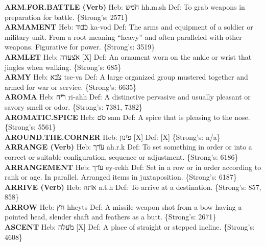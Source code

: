 {\textbf{ARM.FOR.BATTLE (Verb)} Heb: {\large\H חמש} hh.m.sh Def: To grab weapons in preparation for battle. \{Strong's: 2571\}\hfill{}\\

\textbf{ARMAMENT} Heb: {\large\H כבוד} ka-vod Def: The arms and equipment of a soldier or military unit. From a root meaning ``heavy'' and often paralleled with other weapons. Figurative for power. \{Strong's: 3519\}\hfill{}\\

\textbf{ARMLET} Heb: {\large\H אצעדה} {[}X{]} Def: An ornament worn on the ankle or wrist that jingles when walking. \{Strong's: 685\}\hfill{}\\

\textbf{ARMY} Heb: {\large\H צבא} tse-va Def: A large organized group mustered together and armed for war or service. \{Strong's: 6635\}\hfill{}\\

\textbf{AROMA} Heb: {\large\H ריח} ri-ahh Def: A distinctive pervasive and usually pleasant or savory smell or odor. \{Strong's: 7381, 7382\}\hfill{}\\

\textbf{AROMATIC.SPICE} Heb: {\large\H סם} sam Def: A spice that is pleasing to the nose. \{Strong's: 5561\}\hfill{}\\

\textbf{AROUND.THE.CORNER} Heb: {\large\H פינון} {[}X{]} Def: {[}X{]} \{Strong's: n/a\}\hfill{}\\

\textbf{ARRANGE (Verb)} Heb: {\large\H ערך} ah.r.k Def: To set something in order or into a correct or suitable configuration, sequence or adjustment. \{Strong's: 6186\}\hfill{}\\

\textbf{ARRANGEMENT} Heb: {\large\H ערך} ey-rekh Def: Set in a row or in order according to rank or age. In parallel. Arranged items in juxtaposition. \{Strong's: 6187\}\hfill{}\\

\textbf{ARRIVE (Verb)} Heb: {\large\H אתה} a.t.h Def: To arrive at a destination. \{Strong's: 857, 858\}\hfill{}\\

\textbf{ARROW} Heb: {\large\H חץ} hheyts Def: A missile weapon shot from a bow having a pointed head, slender shaft and feathers as a butt. \{Strong's: 2671\}\hfill{}\\

\textbf{ASCENT} Heb: {\large\H מעלה} {[}X{]} Def: A place of straight or stepped incline. \{Strong's: 4608\}\hfill{}\\

}
